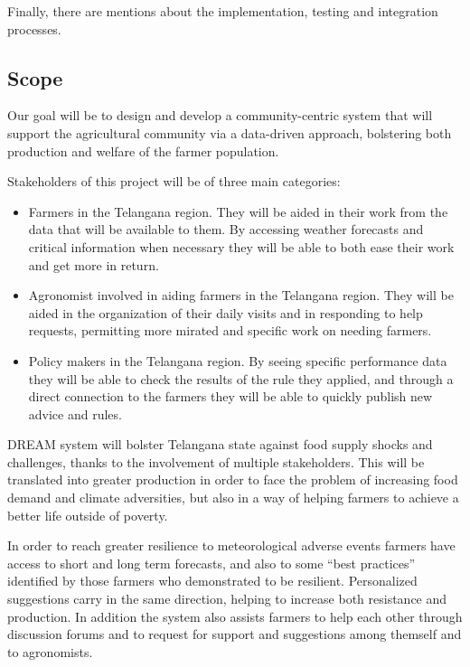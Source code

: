 \documentclass{article}
\begin{document}
Finally, there are mentions about the implementation, testing and integration
processes. \par



\subsection{Scope}

    Our goal will be to design and develop a community-centric system that will support the agricultural community via a data-driven approach, bolstering both production and welfare of the farmer population. \par
    Stakeholders of this project will be of three main categories:
    \begin{itemize}
        \item Farmers in the Telangana region. They will be aided in their work from the data that will be available to them. By accessing weather forecasts and critical information when necessary they will be able to both ease their work and get more in return.
        \item Agronomist involved in aiding farmers in the Telangana region. They will be aided in the organization of their daily visits and in responding to help requests, permitting more mirated and specific work on needing farmers.
        \item Policy makers in the Telangana region. By seeing specific performance data they will be able to check the results of the rule they applied, and through a direct connection to the farmers they will be able to quickly publish new advice and rules.
    \end{itemize}
    
    DREAM system will bolster Telangana state against food supply shocks and challenges, thanks to the involvement of multiple stakeholders. This will be translated into greater production in order to face the problem of increasing food demand and climate adversities, but also in a way of helping farmers to achieve a better life outside of poverty. 

In order to reach greater resilience to meteorological adverse events farmers have access to short and long term forecasts, and also to some “best practices” identified by those farmers who demonstrated to be resilient. Personalized suggestions carry in the same direction, helping to increase both resistance and production. In addition the system also assists farmers to help each other through discussion forums and to request for support and suggestions among themself and to agronomists.
\end{document}
